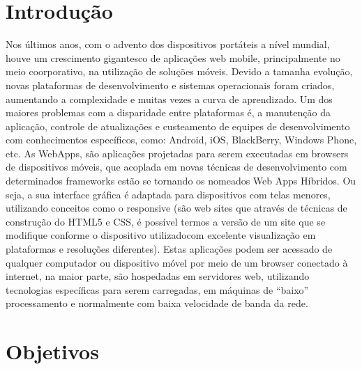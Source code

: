 \documentclass[12pt,openright,twoside,a4paper,english,french,spanish,brazil]{abntex2}
\begin{document}
\tableofcontents 


\textual

\chapter*[Introdução]{Introdução}

Nos últimos anos, com o advento dos dispositivos portáteis a nível mundial, houve um crescimento gigantesco de aplicações web mobile, principalmente no meio coorporativo, na utilização de soluções móveis. Devido a tamanha evolução, novas plataformas de desenvolvimento e sistemas operacionais foram criados, aumentando a complexidade e muitas vezes a curva de aprendizado. Um dos maiores problemas com a disparidade entre plataformas é, a manutenção da aplicação, controle de atualizações e custeamento de equipes de desenvolvimento com conhecimentos específicos, como: Android, iOS, BlackBerry, Windows Phone, etc.
As WebApps, são aplicações projetadas para serem executadas em browsers de dispositivos móveis, que acoplada em novas técnicas de desenvolvimento com determinados frameworks estão se tornando os nomeados Web Apps Híbridos. Ou seja, a sua interface gráfica é adaptada para dispositivos com telas menores, utilizando conceitos como o responsive (são web sites que através de técnicas de construção do HTML5 e CSS, é possível termos a versão de um site que se modifique conforme o dispositivo utilizadocom excelente visualização em plataformas e resoluções diferentes). Estas aplicações podem ser acessado de qualquer computador ou dispositivo móvel por meio de um browser conectado à internet, na maior parte, são hospedadas em servidores web, utilizando tecnologias específicas para serem carregadas, em máquinas de “baixo” processamento e normalmente com baixa velocidade de banda da rede.


\chapter*{Objetivos}
\end{document}
